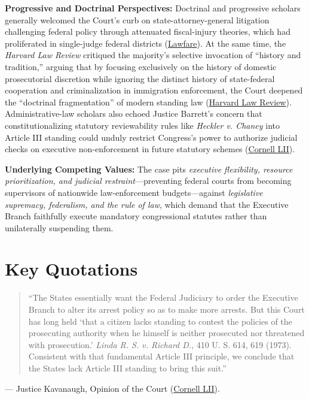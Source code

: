 \documentclass[12pt]{article}
\begin{document}
\textbf{Progressive and Doctrinal Perspectives:} Doctrinal and progressive scholars generally welcomed the Court's curb on state-attorney-general litigation challenging federal policy through attenuated fiscal-injury theories, which had proliferated in single-judge federal districts (\href{https://www.lawfaremedia.org/article/united-states-v.-texas-explained}{Lawfare}). At the same time, the \textit{Harvard Law Review} critiqued the majority's selective invocation of ``history and tradition,'' arguing that by focusing exclusively on the history of domestic prosecutorial discretion while ignoring the distinct history of state-federal cooperation and criminalization in immigration enforcement, the Court deepened the ``doctrinal fragmentation'' of modern standing law (\href{https://harvardlawreview.org/print/vol-137/united-states-v-texas/}{Harvard Law Review}). Administrative-law scholars also echoed Justice Barrett's concern that constitutionalizing statutory reviewability rules like \textit{Heckler v. Chaney} into Article III standing could unduly restrict Congress's power to authorize judicial checks on executive non-enforcement in future statutory schemes (\href{https://www.law.cornell.edu/supremecourt/text/22-58}{Cornell LII}).

\textbf{Underlying Competing Values:} The case pits \textit{executive flexibility, resource prioritization, and judicial restraint}---preventing federal courts from becoming supervisors of nationwide law-enforcement budgets---against \textit{legislative supremacy, federalism, and the rule of law}, which demand that the Executive Branch faithfully execute mandatory congressional statutes rather than unilaterally suspending them.

\section{Key Quotations}

\begin{quote}
``The States essentially want the Federal Judiciary to order the Executive Branch to alter its arrest policy so as to make more arrests. But this Court has long held `that a citizen lacks standing to contest the policies of the prosecuting authority when he himself is neither prosecuted nor threatened with prosecution.' \textit{Linda R. S. v. Richard D.}, 410 U. S. 614, 619 (1973). Consistent with that fundamental Article III principle, we conclude that the States lack Article III standing to bring this suit.''
\end{quote}
\noindent --- Justice Kavanaugh, Opinion of the Court (\href{https://www.law.cornell.edu/supremecourt/text/22-58}{Cornell LII}).
\end{document}
